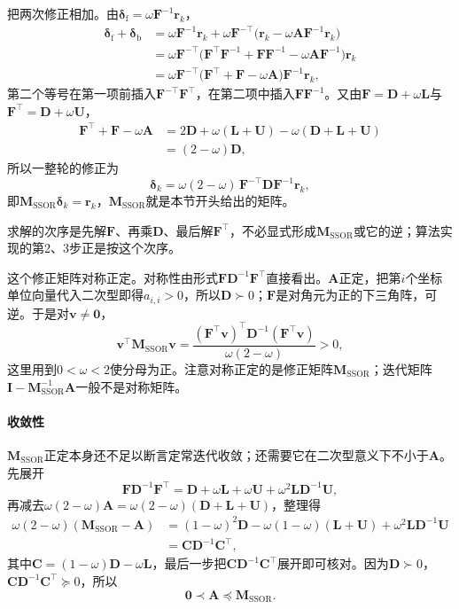 把两次修正相加。由$\bm\delta_{\mathrm f}=\omega\bm F^{-1}\bm r_k$，
\[
\begin{aligned}
\bm\delta_{\mathrm f}+\bm\delta_{\mathrm b}
&=\omega\bm F^{-1}\bm r_k+\omega\bm F^{-\top}\bigl(\bm r_k-\omega\bm A\bm F^{-1}\bm r_k\bigr)\\
&=\omega\bm F^{-\top}\bigl(\bm F^\top\bm F^{-1}+\bm F\bm F^{-1}-\omega\bm A\bm F^{-1}\bigr)\bm r_k\\
&=\omega\bm F^{-\top}\bigl(\bm F^\top+\bm F-\omega\bm A\bigr)\bm F^{-1}\bm r_k ,
\end{aligned}
\]
第二个等号在第一项前插入$\bm F^{-\top}\bm F^\top$，在第二项中插入$\bm F\bm F^{-1}$。又由$\bm F=\bm D+\omega\bm L$与$\bm F^\top=\bm D+\omega\bm U$，
\[
\begin{aligned}
\bm F^\top+\bm F-\omega\bm A
&=2\bm D+\omega(\bm L+\bm U)-\omega(\bm D+\bm L+\bm U)\\
&=(2-\omega)\bm D ,
\end{aligned}
\]
所以一整轮的修正为
\begin{equation}
\bm\delta_k=\omega(2-\omega)\,\bm F^{-\top}\bm D\bm F^{-1}\bm r_k ,
 \label{eq:ls-ssor-combined-correction}
\end{equation}
即$\bm M_{\mathrm{SSOR}}\bm\delta_k=\bm r_k$，$\bm M_{\mathrm{SSOR}}$就是本节开头给出的矩阵。

求解的次序是先解$\bm F$、再乘$\bm D$、最后解$\bm F^\top$，不必显式形成$\bm M_{\mathrm{SSOR}}$或它的逆；算法实现的第2、3步正是按这个次序。

这个修正矩阵对称正定。对称性由形式$\bm F\bm D^{-1}\bm F^\top$直接看出。$\bm A$正定，把第$i$个坐标单位向量代入二次型即得$a_{i,i}>0$，所以$\bm D\succ0$；$\bm F$是对角元为正的下三角阵，可逆。于是对$\bm v\neq\bm0$，
\[
\bm v^\top\bm M_{\mathrm{SSOR}}\bm v=\frac{(\bm F^\top\bm v)^\top\bm D^{-1}(\bm F^\top\bm v)}{\omega(2-\omega)}>0 ,
\]
这里用到$0<\omega<2$使分母为正。注意对称正定的是修正矩阵$\bm M_{\mathrm{SSOR}}$；迭代矩阵$\bm I-\bm M_{\mathrm{SSOR}}^{-1}\bm A$一般不是对称矩阵。

\paragraph{收敛性}
$\bm M_{\mathrm{SSOR}}$正定本身还不足以断言定常迭代收敛；还需要它在二次型意义下不小于$\bm A$。先展开
\[
 \bm F\bm D^{-1}\bm F^\top=\bm D+\omega\bm L+\omega\bm U+\omega^2\bm L\bm D^{-1}\bm U ,
\]
再减去$\omega(2-\omega)\bm A=\omega(2-\omega)(\bm D+\bm L+\bm U)$，整理得
\[
\begin{aligned}
\omega(2-\omega)(\bm M_{\mathrm{SSOR}}-\bm A)
&=(1-\omega)^2\bm D-\omega(1-\omega)(\bm L+\bm U)+\omega^2\bm L\bm D^{-1}\bm U\\
&=\bm C\bm D^{-1}\bm C^\top ,
\end{aligned}
\]
其中$\bm C=(1-\omega)\bm D-\omega\bm L$，最后一步把$\bm C\bm D^{-1}\bm C^\top$展开即可核对。因为$\bm D\succ0$，$\bm C\bm D^{-1}\bm C^\top\succeq0$，所以
\begin{equation}
\bm 0\prec\bm A\preceq\bm M_{\mathrm{SSOR}} .
 \label{eq:ls-ssor-dominates}
\end{equation}

